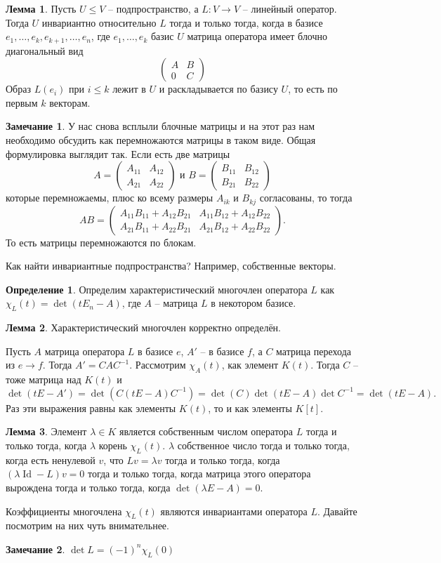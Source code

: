 \documentclass[10pt,a4paper,oneside]{book} %
\theoremstyle{definition}
\newtheorem*{rem}{Замечание}
\newtheorem*{defn}{Определение}
\newtheorem{lem}{Лемма}
\newcommand{\id}{\operatorname{Id}}
\def\dfn{\begin{defn}}
\def\edfn{\end{defn}}
\def\lm{\begin{lem}}
\def\elm{\end{lem}}
\def\rm{\begin{rem}}
\def\erm{\end{rem}}
\def\pmat{\begin{pmatrix}}
\def\epmat{\end{pmatrix}}
\begin{document}
\lm Пусть $U\leq V$ -- подпространство, а $L \colon V \to V$ -- линейный оператор. Тогда $U$ инвариантно относительно $L$ тогда и только тогда, когда в базисе $e_1,\dots,e_k,e_{k+1},\dots,e_n$, где $e_1,\dots,e_k$ базис $U$ матрица оператора имеет блочно диагональный вид
$$\pmat A&B\\
0&C \epmat$$
\proof Образ $L(e_i)$ при $i \leq k$ лежит в $U$ и раскладывается по базису $U$, то есть по первым $k$ векторам.
\endproof
\elm


\rm У нас снова всплыли блочные матрицы и на этот раз нам необходимо обсудить как перемножаются матрицы в таком виде. Общая формулировка выглядит так. Если есть две матрицы
$$A=\pmat A_{11} & A_{12}\\
A_{21}& A_{22}
\epmat \text{ и } B=\pmat B_{11} & B_{12}\\
B_{21}& B_{22}
\epmat $$
которые перемножаемы, плюс ко всему размеры $A_{ik}$ и $B_{kj}$ согласованы, то тогда
$$AB= \pmat A_{11}B_{11}+ A_{12}B_{21} & A_{11}B_{12}+ A_{12}B_{22}\\
A_{21}B_{11}+ A_{22}B_{21}& A_{21}B_{12}+ A_{22}B_{22}\epmat. $$
То есть матрицы перемножаются по блокам.
\erm

Как найти инвариантные подпространства? Например, собственные векторы.

\dfn Определим характеристический многочлен оператора $L$ как $\chi_L(t)=\det(tE_n - A)$, где $A$ -- матрица $L$ в некотором базисе.
\edfn

\lm Характеристический многочлен корректно определён.
\elm
\proof Пусть $A$ матрица оператора $L$ в базисе $e$, $A'$ -- в базисе $f$, а $C$ матрица перехода из $e\to f$. Тогда $A'=CAC^{-1}$. Рассмотрим $\chi_A(t)$, как элемент $K(t)$. Тогда $C$ -- тоже матрица над $K(t)$ и
$$\det(tE-A')=\det(C(tE-A)C^{-1})=\det(C)\det(tE-A)\det C^{-1}=\det(tE-A).$$
Раз эти выражения равны как элементы $K(t)$, то и как элементы $K[t]$.
\endproof

\lm Элемент $\lambda \in K$ является собственным числом оператора $L$ тогда и только тогда, когда $\lambda$ корень $\chi_L(t)$.
\proof $\lambda$ собственное число тогда и только тогда, когда есть ненулевой $v$, что $Lv=\lambda v$ тогда и только тогда, когда $(\lambda \id - L)v=0$ тогда и только тогда, когда матрица этого оператора вырождена тогда и только тогда, когда $\det (\lambda E- A) =0$.
\endproof
\elm


Коэффициенты многочлена $\chi_L(t)$ являются инвариантами оператора $L$. Давайте посмотрим на них чуть внимательнее.
\rm $\det L = (-1)^{n} \chi_L(0)$
\erm
\end{document}
